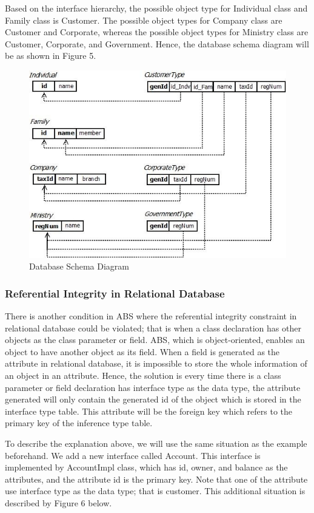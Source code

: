 \documentclass[runningheads,a4paper]{llncs}
\begin{document}
Based on the interface hierarchy, the possible object type for Individual class and Family class is Customer. The possible object types for Company class are Customer and Corporate, whereas the possible object types for Ministry class are Customer, Corporate, and Government. Hence, the database schema diagram will be as shown in Figure 5.

\begin{figure}
	\centering
	\includegraphics[scale=0.7]{db1.jpg}
	\caption{Database Schema Diagram}
	\label{sample}
\end{figure}

\subsubsection{Referential Integrity in Relational Database}
There is another condition in ABS where the referential integrity constraint in relational database could be violated; that is when a class declaration has other objects as the class parameter or field. ABS, which is object-oriented, enables an object to have another object as its field. When a field is generated as the attribute in relational database, it is impossible to store the whole information of an object in an attribute. Hence, the solution is every time there is a class parameter or field declaration has interface type as the data type, the attribute generated will only contain the generated id of the object which is stored in the interface type table. This attribute will be the foreign key which refers to the primary key of the inference type table.

To describe the explanation above, we will use the same situation as the example beforehand. We add a new interface called Account. This interface is implemented by AccountImpl class, which has id, owner, and balance as the attributes, and the attribute id is the primary key. Note that one of the attribute use interface type as the data type; that is customer. This additional situation is described by Figure 6 below.
\end{document}
